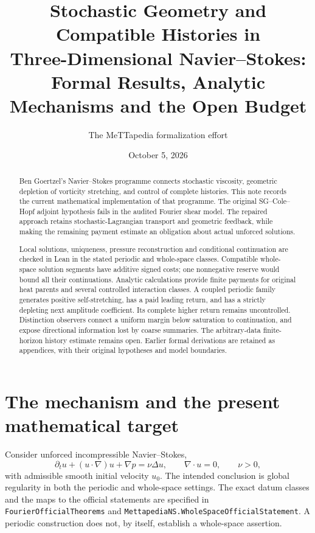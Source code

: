 \documentclass[11pt]{article}
\title{Stochastic Geometry and Compatible Histories in\\
Three-Dimensional Navier--Stokes:\\
Formal Results, Analytic Mechanisms and the Open Budget}
\author{The MeTTapedia formalization effort}
\date{October 5, 2026}
\theoremstyle{definition}
\begin{document}
\maketitle
\sloppy

\begin{abstract}
Ben Goertzel's Navier--Stokes programme connects stochastic viscosity,
geometric depletion of vorticity stretching, and control of complete
histories. This note records the current mathematical implementation of that
programme. The original SG--Cole--Hopf adjoint hypothesis fails in the audited
Fourier shear model. The repaired approach retains stochastic-Lagrangian
transport and geometric feedback, while making the remaining payment estimate
an obligation about actual unforced solutions.

Local solutions, uniqueness, pressure reconstruction and conditional
continuation are checked in Lean in the stated periodic and whole-space
classes. Compatible whole-space solution segments have additive signed costs;
one nonnegative reserve would bound all their continuations. Analytic
calculations provide finite payments for original heat parents and several
controlled interaction classes. A coupled periodic family generates positive
self-stretching, has a paid leading return, and has a strictly depleting next
amplitude coefficient. Its complete higher return remains uncontrolled.
Distinction observers connect a uniform margin below saturation to
continuation, and expose directional information lost by coarse summaries.
The arbitrary-data finite-horizon history estimate remains open. Earlier
formal derivations are retained as appendices, with their original hypotheses
and model boundaries.
\end{abstract}

\setcounter{tocdepth}{1}
\clearpage
\tableofcontents
\clearpage

\section{The mechanism and the present mathematical target}
\label{sec:current-route}

Consider unforced incompressible Navier--Stokes,
\[
 \partial_t u+(u\cdot\nabla)u+\nabla p=\nu\Delta u,
 \qquad \nabla\cdot u=0,\qquad \nu>0,
\]
with admissible smooth initial velocity $u_0$. The intended conclusion is
global regularity in both the periodic and whole-space settings. The exact
datum classes and the maps to the official statements are specified in
\texttt{FourierOfficialTheorems} and
\texttt{MettapediaNS.WholeSpaceOfficialStatement}. A periodic construction
does not, by itself, establish a whole-space assertion.
\end{document}
